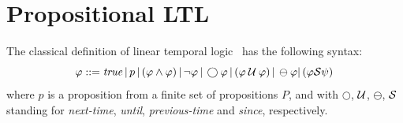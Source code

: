 


\newcommand\eventty{\mathbb{E}}
\newcommand\setof[1]{\mathcal{P}(#1)}


\section{Propositional LTL}

The classical definition of linear temporal logic~\cite{MP} has the following syntax:
\[ \varphi ::= \mathit{true} \, | \,  p \, | \, ( \varphi \wedge \varphi ) \, |  \, \neg  \varphi \, |   \, \bigcirc \varphi \, |  
\, ( \varphi \mathbin{\mathcal{U}} \varphi ) \,|  \, \ominus \varphi |
   \, ( \varphi {\cal S} \psi ) \,  \]
where $p$ is a proposition from a finite set of propositions $P$, and with $\bigcirc$, $\mathbin{\mathcal{U}}$, $\ominus$, ${\cal S}$ standing for {\em next-time}, 
{\em until}, {\em previous-time} and {\em since}, respectively.


